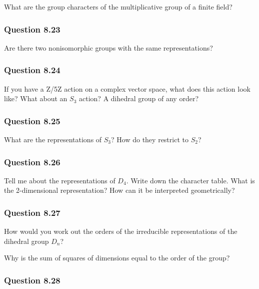 What are the group characters of the multiplicative group of a finite
field?

\hypertarget{question-8.23}{%
\subsubsection{Question 8.23}\label{question-8.23}}

Are there two nonisomorphic groups with the same representations?

\hypertarget{question-8.24}{%
\subsubsection{Question 8.24}\label{question-8.24}}

If you have a Z/5Z action on a complex vector space, what does this
action look like? What about an \(S_3\) action? A dihedral group of any
order?

\hypertarget{question-8.25}{%
\subsubsection{Question 8.25}\label{question-8.25}}

What are the representations of \(S_3\)? How do they restrict to
\(S_2\)?

\hypertarget{question-8.26}{%
\subsubsection{Question 8.26}\label{question-8.26}}

Tell me about the representations of \(D_4\). Write down the character
table. What is the 2-dimensional representation? How can it be
interpreted geometrically?

\hypertarget{question-8.27}{%
\subsubsection{Question 8.27}\label{question-8.27}}

How would you work out the orders of the irreducible representations of
the dihedral group \(D_n\)?

Why is the sum of squares of dimensions equal to the order of the group?

\hypertarget{question-8.28}{%
\subsubsection{Question 8.28}\label{question-8.28}}

